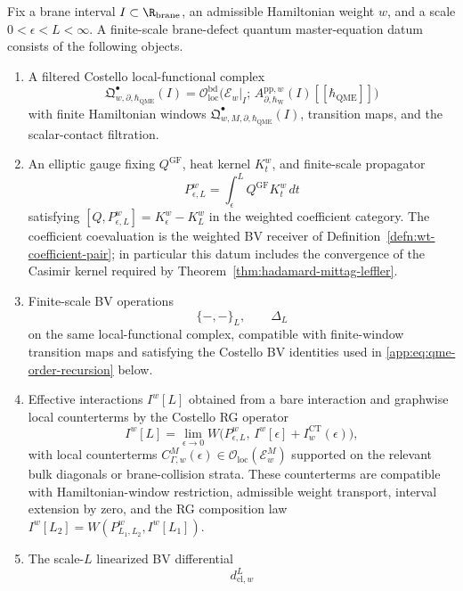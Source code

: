 \begin{defn}
\label{app:defn:finite-scale-brane-defect-qme-datum}
Fix a brane interval \(I\subset \R_{\mathrm{brane}}\), an admissible
Hamiltonian weight \(w\), and a scale \(0<\epsilon<L<\infty\).  A
finite-scale brane-defect quantum master-equation datum consists of the
following objects.
\begin{enumerate}
  \item A filtered Costello local-functional complex
  \[
    \mathfrak Q^\bullet_{w,\partial,\hbar_{\mathrm{QME}}}(I)
	      =
	      \mathcal O_{\mathrm{loc}}^{\mathrm{bd}}
	      \bigl(\mathcal E_w|_I;\,
	      A_{\partial,\hbar_{\mathrm{W}}}^{\mathrm{pp},w}(I)
	      [[\hbar_{\mathrm{QME}}]]\bigr)
	  \]
  with finite Hamiltonian windows
  \(\mathfrak Q^\bullet_{w,M,\partial,\hbar_{\mathrm{QME}}}(I)\),
  transition maps, and the scalar-contact filtration.
  \item An elliptic gauge fixing \(Q^{\mathrm{GF}}\), heat kernel
  \(K_t^w\), and finite-scale propagator
  \[
    P_{\epsilon,L}^w
      =
      \int_\epsilon^L Q^{\mathrm{GF}}K_t^w\,dt
  \]
  satisfying \([Q,P_{\epsilon,L}^w]=K_\epsilon^w-K_L^w\) in the
  weighted coefficient category.  The coefficient coevaluation is the
  weighted BV receiver of Definition~\ref{defn:wt-coefficient-pair};
  in particular this datum includes the convergence of the Casimir
  kernel required by Theorem~\ref{thm:hadamard-mittag-leffler}.
  \item Finite-scale BV operations
  \[
    \{-,-\}_L,\qquad \Delta_L
  \]
  on the same local-functional complex, compatible with finite-window
  transition maps and satisfying the Costello BV identities used in
  \eqref{app:eq:qme-order-recursion} below.
  \item Effective interactions \(I^w[L]\) obtained from a bare
  interaction and graphwise local counterterms by the Costello RG
  operator
  \[
    I^w[L]
      =
      \lim_{\epsilon\to0}
      W\bigl(P_{\epsilon,L}^w,\,
      I^w[\epsilon]+I^{\mathrm{CT}}_w(\epsilon)\bigr),
  \]
  with local counterterms
  \(C_{\Gamma,w}^{M}(\epsilon)\in
  \mathcal O_{\mathrm{loc}}(\mathcal E_w^M)\) supported on the relevant
  bulk diagonals or brane-collision strata.  These counterterms are
  compatible with Hamiltonian-window restriction, admissible weight
  transport, interval extension by zero, and the RG composition law
  \(I^w[L_2]=W(P^w_{L_1,L_2},I^w[L_1])\).
  \item The scale-\(L\) linearized BV differential
  \[
    d_{\mathrm{cl},w}^{L}
\]
\end{enumerate}
\end{defn}
